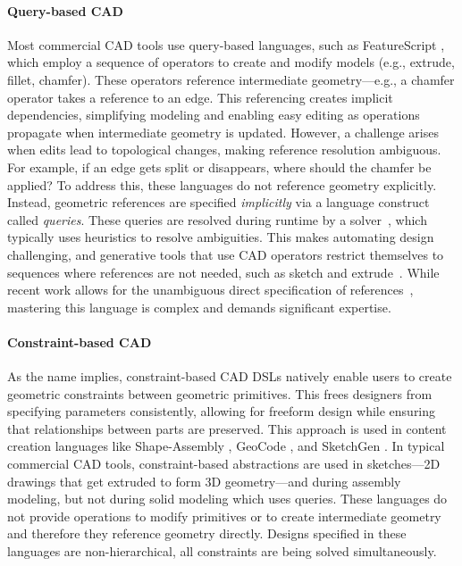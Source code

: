 \paragraph{Query-based CAD}
Most commercial CAD tools use query-based languages, such as FeatureScript \citep{featurescript}, which employ a sequence of operators to create and modify models (e.g., extrude, fillet, chamfer). 
These operators reference intermediate geometry---e.g., a chamfer operator takes a reference to an edge. 
This referencing creates implicit dependencies, simplifying modeling and enabling easy editing as operations propagate when intermediate geometry is updated. 
However, a challenge arises when edits lead to topological changes, making reference resolution ambiguous. 
For example, if an edge gets split or disappears, where should the chamfer be applied? To address this, these languages do not reference geometry explicitly. 
Instead, geometric references are specified \emph{implicitly} via a language construct called \emph{queries}. 
These queries are resolved during runtime by a solver~\citep{cadquery, featurescript}, which typically uses heuristics to resolve ambiguities. 
This makes automating design challenging, and generative tools that use CAD operators restrict themselves to sequences where references are not needed, such as sketch and extrude~\citep{wu2021deepcad, willis_fusion_2021, lambourne_reconstructing_2022}. 
While recent work allows for the unambiguous direct specification of references~\citep{cascaval2023lineage}, mastering this language is complex and demands significant expertise.

 

\paragraph{Constraint-based CAD}
As the name implies, constraint-based CAD DSLs natively enable users to create geometric constraints between geometric primitives. This frees designers from specifying parameters consistently, allowing for freeform design while ensuring that relationships between parts are preserved. This approach is used in content creation languages like Shape-Assembly \citep{jones2020shapeassembly}, GeoCode \citep{pearl2022geocode}, and SketchGen \citep{para2021sketchgen}.
 In typical commercial CAD tools, constraint-based abstractions are used in sketches---2D drawings that get extruded to form 3D geometry---and during assembly modeling, but not during solid modeling which uses queries. 
These languages do not provide operations to modify primitives or to create intermediate geometry and therefore they reference geometry directly.
Designs specified in these languages are non-hierarchical, all constraints are being solved simultaneously.
